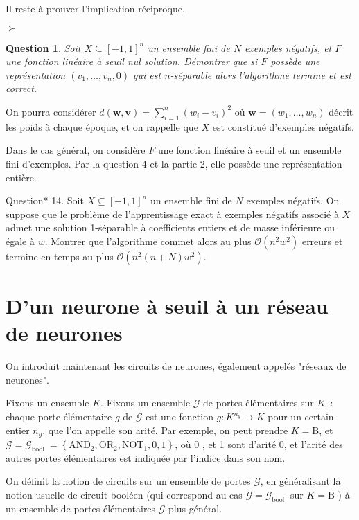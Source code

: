 \documentclass[10pt]{article}
\newtheorem{question}{Question}
\begin{document}
Il reste à prouver l'implication réciproque.

$\succ$ \begin{question}
	Soit $X \subseteq[-1,1]^{n}$ un ensemble fini de $N$ exemples négatifs, et $F$ une fonction linéaire à seuil nul solution. Démontrer que si $F$ possède une représentation $\left(v_{1}, \ldots, v_{n}, 0\right)$ qui est $n$-séparable alors l'algorithme termine et est correct.
\end{question}

On pourra considérer $d(\mathbf{w}, \mathbf{v})=\sum_{i=1}^{n}\left(w_{i}-v_{i}\right)^{2}$ où $\mathbf{w}=\left(w_{1}, \ldots, w_{n}\right)$ décrit les poids à chaque époque, et on rappelle que $X$ est constitué d'exemples négatifs.

Dans le cas général, on considère $F$ une fonction linéaire à seuil et un ensemble fini d'exemples. Par la question 4 et la partie 2, elle possède une représentation entière.

Question* 14. Soit $X \subseteq[-1,1]^{n}$ un ensemble fini de $N$ exemples négatifs. On suppose que le problème de l'apprentissage exact à exemples négatifs associé à $X$ admet une solution 1-séparable à coefficients entiers et de masse inférieure ou égale à $w$. Montrer que l'algorithme commet alors au plus $\mathcal{O}\left(n^{2} w^{2}\right)$ erreurs et termine en temps au plus $\mathcal{O}\left(n^{2}(n+N) w^{2}\right)$.

\section{\label{sec:reseau-neurones}D'un neurone à seuil à un réseau de neurones}
On introduit maintenant les circuits de neurones, également appelés "réseaux de neurones".

Fixons un ensemble $K$. Fixons un ensemble $\mathcal{G}$ de portes élémentaires sur $K$ : chaque porte élémentaire $g$ de $\mathcal{G}$ est une fonction $g: K^{n_{g}} → K$ pour un certain entier $n_{g}$, que l'on appelle son arité. Par exemple, on peut prendre $K=\mathrm{B}$, et $\mathcal{G}=\mathcal{G}_{\text {bool }}=\left\{\mathrm{AND}_{2}, \mathrm{OR}_{2}, \mathrm{NOT}_{1}, 0,1\right\}$, où 0 , et 1 sont d'arité 0, et l'arité des autres portes élémentaires est indiquée par l'indice dans son nom.

On définit la notion de circuits sur un ensemble de portes $\mathcal{G}$, en généralisant la notion usuelle de circuit booléen (qui correspond au cas $\mathcal{G}=\mathcal{G}_{\text {bool }}$ sur $K=\mathrm{B}$ ) à un ensemble de portes élémentaires $\mathcal{G}$ plus général.
\end{document}
